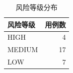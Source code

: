 \begin{table}[H]
\centering
\caption{风险等级分布}
\label{tab:risk_dist}
\small
\begin{tabular}{lr}
\toprule
\textbf{风险等级} & \textbf{用例数} \\
\midrule
    HIGH & 4 \\
    MEDIUM & 17 \\
    LOW & 7 \\
\bottomrule
\end{tabular}
\end{table}